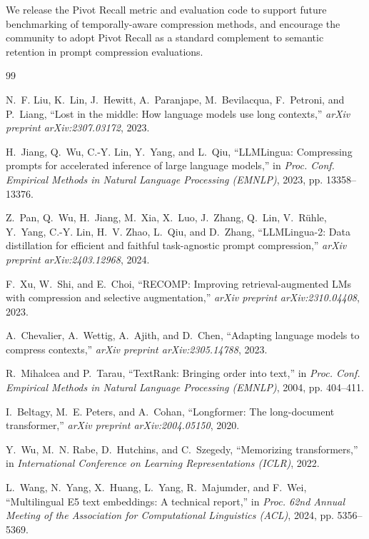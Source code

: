 \documentclass[conference]{IEEEtran}
\begin{document}
We release the Pivot Recall metric and evaluation code to support future
benchmarking of temporally-aware compression methods, and encourage the
community to adopt Pivot Recall as a standard complement to semantic retention
in prompt compression evaluations.


\begin{thebibliography}{99}

N.~F. Liu, K.~Lin, J.~Hewitt, A.~Paranjape, M.~Bevilacqua, F.~Petroni, and
  P.~Liang, ``Lost in the middle: How language models use long contexts,''
  \textit{arXiv preprint arXiv:2307.03172}, 2023.

H.~Jiang, Q.~Wu, C.-Y. Lin, Y.~Yang, and L.~Qiu, ``{LLMLingua}: Compressing
  prompts for accelerated inference of large language models,'' in
  \textit{Proc. Conf. Empirical Methods in Natural Language Processing
  (EMNLP)}, 2023, pp. 13358--13376.

Z.~Pan, Q.~Wu, H.~Jiang, M.~Xia, X.~Luo, J.~Zhang, Q.~Lin, V.~R\"{u}hle,
  Y.~Yang, C.-Y. Lin, H.~V. Zhao, L.~Qiu, and D.~Zhang, ``{LLMLingua-2}:
  Data distillation for efficient and faithful task-agnostic prompt
  compression,'' \textit{arXiv preprint arXiv:2403.12968}, 2024.

F.~Xu, W.~Shi, and E.~Choi, ``{RECOMP}: Improving retrieval-augmented {LMs}
  with compression and selective augmentation,'' \textit{arXiv preprint
  arXiv:2310.04408}, 2023.

A.~Chevalier, A.~Wettig, A.~Ajith, and D.~Chen, ``Adapting language models
  to compress contexts,'' \textit{arXiv preprint arXiv:2305.14788}, 2023.

R.~Mihalcea and P.~Tarau, ``{TextRank}: Bringing order into text,'' in
  \textit{Proc. Conf. Empirical Methods in Natural Language Processing
  (EMNLP)}, 2004, pp. 404--411.

I.~Beltagy, M.~E. Peters, and A.~Cohan, ``Longformer: The long-document
  transformer,'' \textit{arXiv preprint arXiv:2004.05150}, 2020.

Y.~Wu, M.~N. Rabe, D.~Hutchins, and C.~Szegedy, ``Memorizing transformers,''
  in \textit{International Conference on Learning Representations (ICLR)},
  2022.

L.~Wang, N.~Yang, X.~Huang, L.~Yang, R.~Majumder, and F.~Wei, ``Multilingual
  {E5} text embeddings: A technical report,'' in \textit{Proc. 62nd Annual
  Meeting of the Association for Computational Linguistics (ACL)}, 2024,
  pp. 5356--5369.


\end{thebibliography}
\end{document}
